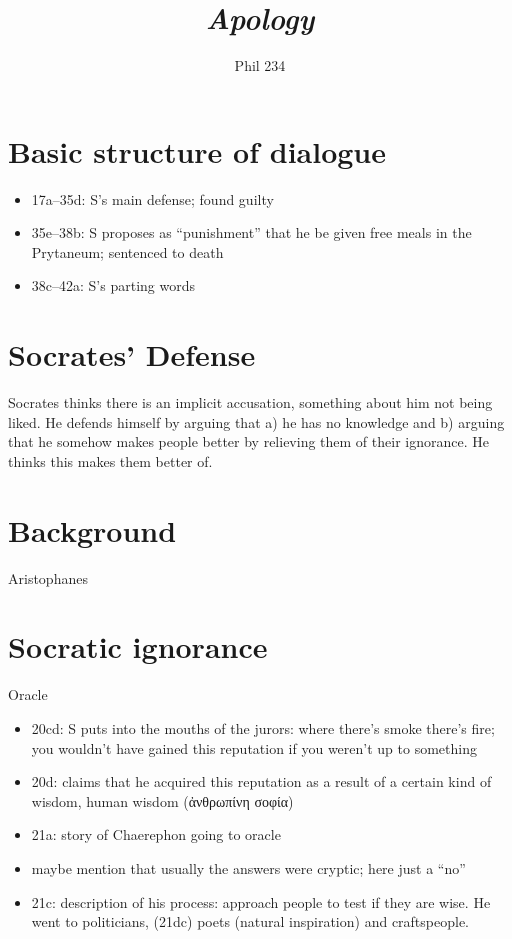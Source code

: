 \documentclass[10 pt]{article}
\begin{document}
\author{Phil 234}
\title{\emph{Apology}}
\maketitle

\section*{Basic structure of dialogue}

\begin{itemize}
\item 17a--35d: S's main defense; found guilty
\item  35e--38b: S proposes as ``punishment'' that he be given free meals in the Prytaneum; sentenced to death
\item 38c--42a: S's parting words
\end{itemize}

\section*{Socrates' Defense}
Socrates thinks there is an implicit accusation, something about him not being liked. He defends himself by arguing that a) he has no knowledge and b) arguing that he somehow makes people better by relieving them of their ignorance. He thinks this makes them better of. 

\section*{Background}
Aristophanes


\section*{Socratic ignorance}
Oracle
\begin{itemize}
\item 20cd: S puts into the mouths of the jurors: where there’s smoke there’s fire; you wouldn’t have gained this reputation if you weren’t up to something
\item 20d: claims that he acquired this reputation as a result of a certain kind of wisdom, human wisdom (ἀνθρωπίνη σοφία)
\item	21a: story of Chaerephon going to oracle
\item	maybe mention that usually the answers were cryptic; here just a “no”
\item	21c: description of his process: approach people to test if they are wise. He went to politicians, (21dc) poets (natural inspiration) and craftspeople.
\end{itemize}
\end{document}

